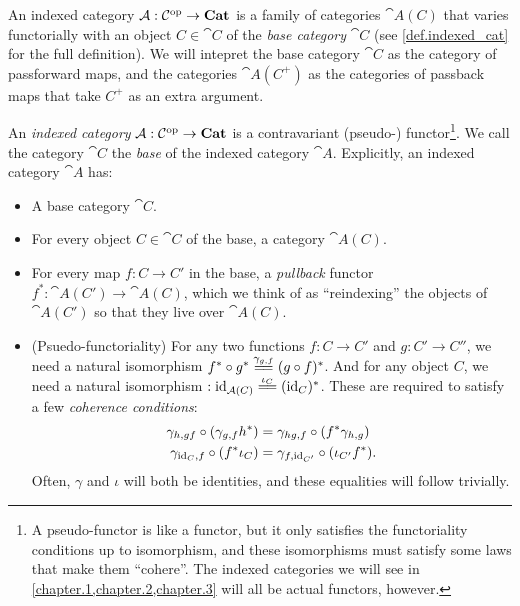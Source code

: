 \documentclass[DynamicalBook]{subfiles}
\begin{document}
An indexed category $\mathcal{A} : \mathcal{C}^{\textnormal{op}} \to \textbf{Cat}$ is a family of
categories $\cat{A}(C)$ that varies functorially with an object $C \in \cat{C}$
of the \emph{base category} $\cat{C}$ (see \cref{def.indexed_cat} for the full
definition). We will intepret the base category $\cat{C}$ as the category of
passforward maps, and the categories $\cat{A}(C^+)$ as the categories of
passback maps that take $C^+$ as an extra argument.

\begin{definition}
  An \emph{indexed category} $\mathcal{A} : \mathcal{C}^{\textnormal{op}} \to \textbf{Cat}$ is a
  contravariant (pseudo-) functor\footnote{A pseudo-functor is like a functor,
    but it only satisfies the functoriality conditions up to isomorphism, and
    these isomorphisms must satisfy some laws that make them ``cohere''. The
    indexed categories we will see in \cref{chapter.1,chapter.2,chapter.3}
    will all be actual functors, however.}. We call the category $\cat{C}$ the
  \emph{base} of the indexed category $\cat{A}$. Explicitly, an indexed
  category $\cat{A}$ has:
  \begin{itemize}
  \item A base category $\cat{C}$.
  \item For every object $C \in \cat{C}$ of the base, a category $\cat{A}(C)$.
  \item For every map $f : C \to C'$ in the base, a \emph{pullback} functor
    $f^{\ast} : \cat{A}(C') \to \cat{A}(C)$, which we think of as ``reindexing''
    the objects of $\cat{A}(C')$ so that they live over $\cat{A}(C)$.
  \item (Psuedo-functoriality) For any two functions $f : C \to C'$ and $g : C' \to C''$, we need a
    natural isomorphism $f^{\ast} \circ g^{\ast} \xequals{\gamma_{g, f}} (g \circ
    f)^{\ast}$. And for any object $C$, we need a natural isomorphism $:
    \id_{\cat{A}(C)} \xequals{\iota_C } (\id_C)^{\ast}$. These are required to satisfy a
    few \emph{coherence conditions}:
\begin{align}
  \gamma_{h,gf} \circ (\gamma_{g, f}h^{\ast}) &= \gamma_{hg, f} \circ (f^{\ast}\gamma_{h, g}) \\
  \gamma_{\mathrm{id}_C, f} \circ (f^{\ast}\iota_C) &= \gamma_{f, \mathrm{id}_{C'}} \circ (\iota_{C'} f^{\ast}).
\end{align}
   Often, $\gamma$ and $\iota$ will both be identities, and these equalities
   will follow trivially.
  \end{itemize}
\end{definition}
\end{document}
